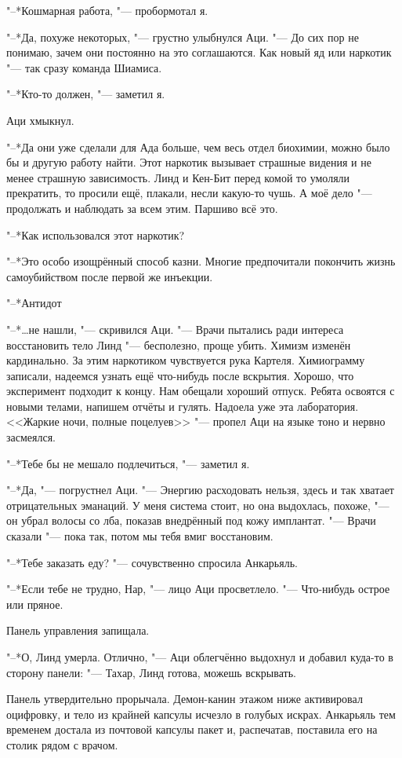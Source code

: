 \documentclass[a4paper,10pt]{book}
\newcommand{\ldotst}{\so{...}\xspace}
\newcommand{\ldotsq}{\so{?\hbox{\hspace{-.212em}}..}\xspace}
\begin{document}
"--*Кошмарная работа, "--- пробормотал я.

"--*Да, похуже некоторых, "--- грустно улыбнулся Аци. "--- До сих пор не 
понимаю, 
зачем они постоянно на это соглашаются. Как новый яд или наркотик "--- так 
сразу 
команда Шиамиса. 

"--*Кто-то должен, "--- заметил я.

Аци хмыкнул.

"--*Да они уже сделали для Ада больше, чем весь отдел биохимии, можно было бы и 
другую работу найти. Этот наркотик вызывает страшные видения и не менее 
страшную зависимость. Линд и Кен-Бит перед комой то умоляли прекратить, то 
просили ещё, плакали, несли какую-то чушь. А моё дело "--- продолжать и 
наблюдать за всем этим. Паршиво всё это.

"--*Как использовался этот наркотик?

"--*Это особо изощрённый способ казни. Многие предпочитали покончить жизнь 
самоубийством после первой же инъекции.

"--*Антидот\ldotsq

"--*\ldots не нашли, "--- скривился Аци. "--- Врачи пытались ради интереса 
восстановить тело Линд "--- бесполезно, проще убить. Химизм изменён 
кардинально. 
За этим наркотиком чувствуется рука Картеля. Химиограмму записали, надеемся 
узнать ещё что-нибудь после вскрытия. Хорошо, что эксперимент подходит к концу. 
Нам обещали хороший отпуск. Ребята освоятся с новыми телами, напишем отчёты и 
гулять. Надоела уже эта лаборатория. <<Жаркие ночи, полные поцелуев\ldotst>> 
"--- 
пропел Аци на языке тоно и нервно засмеялся.

"--*Тебе бы не мешало подлечиться, "--- заметил я.

"--*Да, "--- погрустнел Аци. "--- Энергию расходовать нельзя, здесь и так 
хватает 
отрицательных эманаций. У меня система стоит, но она выдохлась, похоже, "--- он 
убрал волосы со лба, показав внедрённый под кожу имплантат. "--- Врачи сказали 
"--- пока так, потом мы тебя вмиг восстановим.

"--*Тебе заказать еду? "--- сочувственно спросила Анкарьяль.

"--*Если тебе не трудно, Нар, "--- лицо Аци просветлело. "--- Что-нибудь острое 
или пряное.

Панель управления запищала.

"--*О, Линд умерла. Отлично, "--- Аци облегчённо выдохнул и добавил куда-то в 
сторону панели: "--- Тахар, Линд готова, можешь вскрывать.

Панель утвердительно прорычала. Демон-канин этажом ниже активировал оцифровку, 
и тело из крайней капсулы исчезло в голубых искрах. Анкарьяль тем временем 
достала из почтовой капсулы пакет и, распечатав, поставила его на столик рядом 
с врачом.
\end{document}

